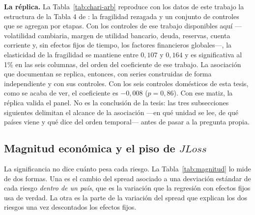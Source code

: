 \textbf{La réplica.} La Tabla~\ref{tab:chari-arb} reproduce con los datos de este trabajo la estructura de la Tabla 4 de \citet{Chari2024b}: la fragilidad rezagada y un conjunto de controles que se agregan por etapas. Con los controles de ese trabajo disponibles aquí ---volatilidad cambiaria, margen de utilidad bancario, deuda, reservas, cuenta corriente y, sin efectos fijos de tiempo, los factores financieros globales---, la elasticidad de la fragilidad se mantiene entre $0{,}107$ y $0{,}164$ y es significativa al 1\% en las seis columnas, del orden del coeficiente de ese trabajo. La asociación que documentan \citet{Chari2024b} se replica, entonces, con series construidas de forma independiente y con sus controles. Con los seis controles domésticos de esta tesis, como se acaba de ver, el coeficiente es $-0{,}008$ ($p=0{,}86$). Con ese matiz, la réplica valida el panel. No es la conclusión de la tesis: las tres subsecciones siguientes delimitan el alcance de la asociación ---en qué unidad se lee, de qué países viene y qué dice del orden temporal--- antes de pasar a la pregunta propia.



\subsection{Magnitud económica y el piso de \texorpdfstring{$JLoss$}{JLoss}}
\label{sec:magnitud}

La significancia no dice cuánto pesa cada riesgo. La Tabla~\ref{tab:magnitud} lo mide de dos formas. Una es el cambio del spread asociado a una desviación estándar de cada riesgo \emph{dentro de un país}, que es la variación que la regresión con efectos fijos usa de verdad. La otra es la parte de la variación del spread que explican los dos riesgos una vez descontados los efectos fijos.

